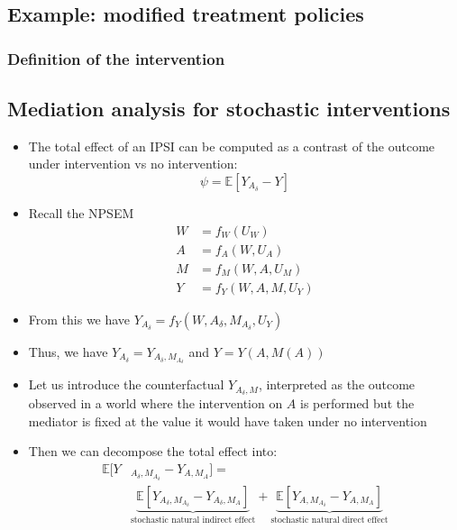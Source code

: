 \documentclass[
  12pt,
]{book}
\providecommand{\tightlist}{%
  \setlength{\itemsep}{0pt}\setlength{\parskip}{0pt}}
\theoremstyle{definition}
\theoremstyle{definition}
\theoremstyle{definition}
\newcommand{\E}{\mathbb{E}}
\newcommand{\1}{\mathbbm{1}}
\begin{document}
\hypertarget{example-modified-treatment-policies}{%
\subsection{Example: modified treatment policies}\label{example-modified-treatment-policies}}

\hypertarget{definition-of-the-intervention-1}{%
\subsubsection*{Definition of the intervention}\label{definition-of-the-intervention-1}}


\hypertarget{mediation-analysis-for-stochastic-interventions}{%
\subsection{Mediation analysis for stochastic interventions}\label{mediation-analysis-for-stochastic-interventions}}

\begin{itemize}
\tightlist
\item
  The total effect of an IPSI can be computed as a contrast of the outcome under
  intervention vs no intervention:
  \begin{equation*}
    \psi = \E[Y_{A_\delta} - Y]
  \end{equation*}
\item
  Recall the NPSEM
  \begin{align}
    W & = f_W(U_W)\\
    A & = f_A(W, U_A)\\
    M & = f_M(W, A, U_M)\\
    Y & = f_Y(W, A, M, U_Y)
  \end{align}
\item
  From this we have \(Y_{A_\delta} = f_Y(W, A_\delta, M_{A_\delta}, U_Y)\)
\item
  Thus, we have \(Y_{A_\delta} = Y_{A_\delta, M_{A_\delta}}\) and \(Y = Y(A,M(A))\)
\item
  Let us introduce the counterfactual \(Y_{A_\delta,M}\), interpreted as the
  outcome observed in a world where the intervention on \(A\) is performed but the
  mediator is fixed at the value it would have taken under no intervention
\item
  Then we can decompose the total effect into:
  \begin{align*}
    \E[Y&_{A_\delta,M_{A_\delta}} - Y_{A,M_A}] = \\
    &\underbrace{\E[Y_{A_\delta,M_{A_\delta}} -
      Y_{A_\delta,M_A}]}_{\text{stochastic natural indirect effect}} +
      \underbrace{\E[Y_{A,M_{A_\delta}} -
      Y_{A,M_A}]}_{\text{stochastic natural direct effect}}
  \end{align*}
\end{itemize}
\end{document}
